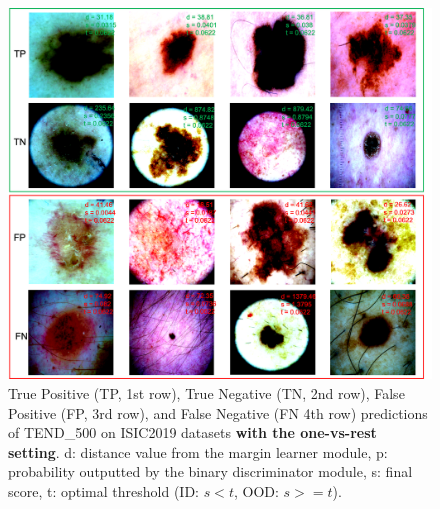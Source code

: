 \documentclass[12pt]{spieman}  %
\begin{document}
\begin{spacing}{2}
\begin{figure}[tp]
\begin{center}
  \includegraphics[width=\linewidth]{fig6.png}
\end{center}
  \caption{True Positive (TP, 1st row), True Negative (TN, 2nd row), False Positive (FP, 3rd row), and False Negative (FN 4th row) predictions of TEND\_500 on ISIC2019 datasets \textbf{with the one-vs-rest setting}. d: distance value from the margin learner module, p: probability outputted by the binary discriminator module, s: final score, t: optimal threshold (ID: $s<t$, OOD: $s>=t$).} 
\label{fig:isic_cases}
\end{figure}


\end{spacing}
\end{document}
